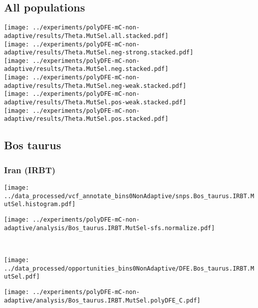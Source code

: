 \subsection{All populations}
\begin{center}
    \texttt{[image: ../experiments/polyDFE-mC-non-adaptive/results/Theta.MutSel.all.stacked.pdf]} \\
    \texttt{[image: ../experiments/polyDFE-mC-non-adaptive/results/Theta.MutSel.neg-strong.stacked.pdf]} \\
    \texttt{[image: ../experiments/polyDFE-mC-non-adaptive/results/Theta.MutSel.neg.stacked.pdf]} \\
    \texttt{[image: ../experiments/polyDFE-mC-non-adaptive/results/Theta.MutSel.neg-weak.stacked.pdf]} \\
    \texttt{[image: ../experiments/polyDFE-mC-non-adaptive/results/Theta.MutSel.pos-weak.stacked.pdf]} \\
    \texttt{[image: ../experiments/polyDFE-mC-non-adaptive/results/Theta.MutSel.pos.stacked.pdf]}

\end{center}

\subsection{Bos taurus}

\subsubsection{Iran (IRBT)}

\begin{minipage}{0.49\linewidth}
    \texttt{[image: ../data\_processed/vcf\_annotate\_bins0NonAdaptive/snps.Bos\_taurus.IRBT.MutSel.histogram.pdf]}
\end{minipage}
\begin{minipage}{0.49\linewidth}
    \texttt{[image: ../experiments/polyDFE-mC-non-adaptive/analysis/Bos\_taurus.IRBT.MutSel-sfs.normalize.pdf]}
\end{minipage}
\\
\begin{minipage}{0.49\linewidth}
    \texttt{[image: ../data\_processed/opportunities\_bins0NonAdaptive/DFE.Bos\_taurus.IRBT.MutSel.pdf]}
\end{minipage}
\begin{minipage}{0.49\linewidth}
    \texttt{[image: ../experiments/polyDFE-mC-non-adaptive/analysis/Bos\_taurus.IRBT.MutSel.polyDFE\_C.pdf]}
\end{minipage}
\\

